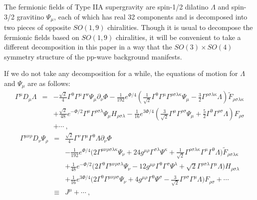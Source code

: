 \documentclass[a4paper,12pt]{article}
\numberwithin{equation}{section}
\begin{document}
The fermionic fields of Type IIA supergravity are spin-1/2 dilatino
$\Lambda$ and spin-3/2 gravitino $\Psi_\mu$, each of which has real 32
components and is decomposed into two pieces of opposite $SO(1,9)$
chiralities.  Though it is usual to decompose the fermionic fields
based on $SO(1,9)$ chiralities, it will be convenient to take a
different decomposition in this paper in a way that the $SO(3) \times
SO(4)$ symmetry structure of the pp-wave background manifests.

If we do not take any decomposition for a while, the equations of
motion for $\Lambda$ and $\Psi_\mu$ are as follows:
\begin{eqnarray}
\Gamma^\mu D_\mu \Lambda
 &=& - \frac{\sqrt{2}}{4} \Gamma^9 \Gamma^\mu \Gamma^\nu
        \Psi_\mu \partial_\nu \Phi
     - \frac{1}{192} e^{\Phi/4}
      \left( \frac{1}{\sqrt{2}} \Gamma^9 \Gamma^\mu
          \Gamma^{\rho\sigma\lambda\kappa} \Psi_\mu
       - \frac{3}{2} \Gamma^{\rho\sigma\lambda\kappa} \Lambda
      \right)
      {\tilde{F}}_{\rho\sigma\lambda\kappa}
  \nonumber \\
 & & + \frac{\sqrt{2}}{48} e^{-\Phi/2} \Gamma^\mu
       \Gamma^{\rho\sigma\lambda} \Psi_\mu H_{\rho\sigma\lambda}
     - \frac{1}{16} e^{3 \Phi /4}
     \left( \frac{3}{\sqrt{2}} \Gamma^\mu \Gamma^{\rho\sigma} \Psi_\mu
      + \frac{5}{2} \Gamma^9 \Gamma^{\rho\sigma} \Lambda
     \right)  F_{\rho\sigma}
  \nonumber \\
 & & + \cdots ~,
\label{dilatino}
\end{eqnarray}
\begin{eqnarray}
\Gamma^{\mu\nu\rho} D_\nu \Psi_\rho
 &=&  \frac{\sqrt{2}}{4} \Gamma^\nu \Gamma^\mu \Gamma^9
            \Lambda \partial_\nu \Phi
  \nonumber \\
 & & - \frac{1}{192} e^{\Phi/4}
      \bigg( 2 \Gamma^{\mu\nu\rho\sigma\lambda\kappa} \Psi_\nu
           + 24 g^{\mu\rho} \Gamma^{\sigma\lambda} \Psi^\kappa
           + \frac{1}{\sqrt{2}} \Gamma^{\rho\sigma\lambda\kappa}
             \Gamma^\mu \Gamma^9 \Lambda
      \bigg)  {\tilde{F}}_{\rho\sigma\lambda\kappa}
  \nonumber \\
 & & + \frac{1}{48} e^{-\Phi/2}
      \bigg( 2 \Gamma^9 \Gamma^{\mu\nu\rho\sigma\lambda} \Psi_\nu
            -12 g^{\mu\rho} \Gamma^9 \Gamma^\sigma \Psi^\lambda
            + \sqrt{2} \Gamma^{\rho\sigma\lambda} \Gamma^\mu
              \Lambda
      \bigg) H_{\rho\sigma\lambda}
  \nonumber \\
 & & + \frac{1}{16} e^{3 \Phi /4}
     \bigg( 2 \Gamma^9 \Gamma^{\mu\nu\rho\sigma} \Psi_\nu
           + 4 g^{\mu\rho} \Gamma^9 \Psi^\sigma
           - \frac{3}{\sqrt{2}} \Gamma^{\rho\sigma} \Gamma^\mu
             \Lambda
     \bigg) F_{\rho\sigma} + \cdots
  \nonumber \\
 & \equiv & J^\mu + \cdots ~,
\label{gravitino}
\end{eqnarray}
\end{document}
